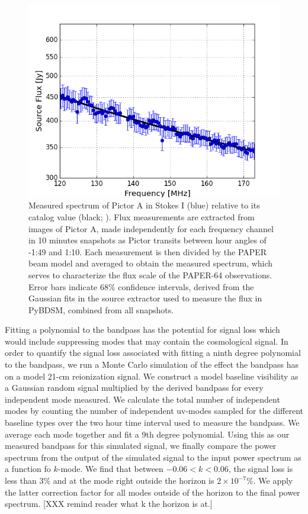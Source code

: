 \documentclass[twocolumn,numberedappendix]{emulateapj} \shorttitle{New Limits on the 21 cm Power Spectrum at $z=8.4$}
\begin{document}
\begin{figure}
\centering
\includegraphics[width=\columnwidth]{plots/picspec.png}
\caption{
Measured spectrum of Pictor A in Stokes I (blue) relative to its catalog
value (black; \citealt{jacobs_et_al2013}).  Flux measurements are
extracted from images of Pictor A, made independently for each frequency channel in
10 minutes snapshots as Pictor transits between hour angles of -1:49
and 1:10.  Each measurement is then divided by the PAPER beam model and
averaged to obtain the measured spectrum, which serves to characterize the flux
scale of the PAPER-64 observations. Error bars indicate 68\% confidence
intervals, derived from the Gaussian fits in the source extractor used to
measure the flux in PyBDSM, combined from all snapshots.
}\label{fig:pic_spec}
\end{figure}


Fitting a polynomial to the bandpass has the potential for signal loss which
would include suppressing modes that may contain the cosmological signal. In order to
quantify the signal loss associated with fitting a ninth degree polynomial to
the bandpass, we run a Monte Carlo simulation of the effect the bandpass has on
a model 21-cm reionization signal. We construct a model baseline visibility as a Gaussian
random signal 
multiplied by the derived bandpass for every independent mode measured. We
calculate the total number of independent modes by counting the number of
independent uv-modes sampled for the different baseline types over the two hour
time interval used to measure the bandpass. We average each mode together and
fit a 9th degree polynomial. Using this as our measured bandpass for this
simulated signal, we finally compare the power spectrum from the output of the
simulated signal to the input power spectrum as a function fo $k$-mode.  We
find that between $-0.06 < k < 0.06$, the signal loss is less than $3\%$ and at
the mode right outside the horizon is $2\times{10^{-7}}\%$. We apply the latter
correction factor for all modes outside of the horizon to the final power
spectrum.
[XXX remind reader what k the horizon is at.]
\end{document}
